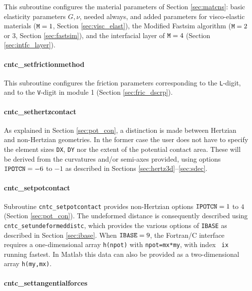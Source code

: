 \documentclass[12pt]{report}
\begin{document}
This subroutine configures the material parameters of Section
\ref{sec:matcns}: basic elasticity parameters $G, \nu$, needed always, and
added parameters for visco-elastic materials (${\tt M}=1$, Section
\ref{sec:visc_elast}), the Modified Fastsim algorithm (${\tt M}=2$ or 3,
Section \ref{sec:fastsim}), and the interfacial layer of ${\tt M}=4$
(Section \ref{sec:intfc_layer}).

\paragraph{cntc\_setfrictionmethod}

This subroutine configures the friction parameters corresponding to the
{\tt L}-digit, and to the {\tt V}-digit in module 1 (Section
\ref{sec:fric_dscrp}).

\paragraph{cntc\_sethertzcontact}

As explained in Section \ref{sec:pot_con}, a distinction is made between
Hertzian and non-Hertzian geometries. In the former case the user does not
have to specify the element sizes {\tt DX}, {\tt DY} nor the extent of the
potential contact area. These will be derived from the curvatures and/or
semi-axes provided, using options ${\tt IPOTCN}=-6$ to $-1$ as described
in Sections \ref{sec:hertz3d}--\ref{sec:sdec}.

\paragraph{cntc\_setpotcontact}

Subroutine {\tt cntc\_setpotcontact} provides non-Hertzian options
${\tt IPOTCN}=1$ to $4$ (Section \ref{sec:pot_con}). The undeformed
distance is consequently described using {\tt cntc\_set\-un\-de\-formed\-distc},
which provides the various options of {\tt IBASE} as described in Section
\ref{sec:ibase}.  When ${\tt IBASE}=9$, the Fortran/C interface requires a
one-dimensional array {\tt h(npot)} with {\tt npot=mx*my}, with index {\tt
ix} running fastest. In Matlab this data can also be provided as a
two-dimensional array {\tt h(my,mx)}.

\paragraph{cntc\_settangentialforces}
\end{document}
